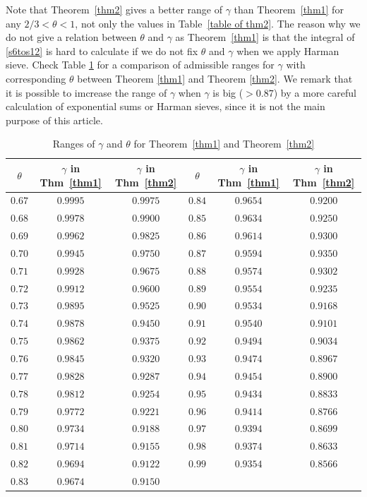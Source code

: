 \documentclass[12pt, reqno, twoside, letterpaper]{amsart}
\numberwithin{equation}{section}
\theoremstyle{customthm}
\theoremstyle{customrem}
\begin{document}
Note that Theorem~\ref{thm2} gives a better range of $\gamma$ than Theorem~\ref{thm1} for any $2/3 < \theta < 1$, not only the values in Table~\ref{table of thm2}. The reason why we do not give a relation between $\theta$ and $\gamma$ as Theorem~\ref{thm1} is that the integral of \eqref{s6tos12} is hard to calculate if we do not fix $\theta$ and $\gamma$ when we apply Harman sieve. Check Table \ref{table of thm1 and thm2} for a comparison of admissible ranges for $\gamma$ with corresponding $\theta$ between Theorem \ref{thm1} and Theorem \ref{thm2}. We remark that it is possible to imcrease the range of $\gamma$ when $\gamma$ is big ($>0.87$) by a more careful calculation of exponential sums or Harman sieves, since it is not the main purpose of this article. 

\begin{table}[htbp]	
	
	\centering
	\caption{Ranges of $\gamma$ and $\theta$ for Theorem~\ref{thm1} and Theorem~\ref{thm2} }
	\begin{tabular}{cccccc}
		\toprule
		$\theta$ & $\gamma$ in Thm~\ref{thm1} & $\gamma$ in Thm~\ref{thm2} & $\theta$ & $\gamma$ in Thm~\ref{thm1} & $\gamma$ in Thm~\ref{thm2} \\
		\midrule
		$0.67$   & $0.9995$   & $0.9975$  & $0.84$ & $0.9654$ & $0.9200$\\
		$0.68$   & $0.9978$   & $0.9900$  & $0.85$ & $0.9634$ & $0.9250$\\
		$0.69$   & $0.9962$   & $0.9825$  & $0.86$ & $0.9614$ & $0.9300$\\
		$0.70$   & $0.9945$   & $0.9750$  & $0.87$ & $0.9594$ & $0.9350$\\
		$0.71$   & $0.9928$   & $0.9675$  & $0.88$ & $0.9574$ & $0.9302$\\
		$0.72$   & $0.9912$   & $0.9600$  & $0.89$ & $0.9554$ & $0.9235$\\
		$0.73$   & $0.9895$   & $0.9525$  & $0.90$ & $0.9534$ & $0.9168$\\
		$0.74$   & $0.9878$   & $0.9450$  & $0.91$ & $0.9540$ & $0.9101$\\
		$0.75$   & $0.9862$   & $0.9375$  & $0.92$ & $0.9494$ & $0.9034$\\
		$0.76$   & $0.9845$   & $0.9320$   & $0.93$ & $0.9474$ & $0.8967$\\
		$0.77$   & $0.9828$   & $0.9287$   & $0.94$ & $0.9454$ & $0.8900$\\
		$0.78$   & $0.9812$   & $0.9254$   & $0.95$ & $0.9434$ & $0.8833$\\
		$0.79$   & $0.9772$   & $0.9221$   & $0.96$ & $0.9414$ & $0.8766$\\
		$0.80$   & $0.9734$   & $0.9188$   & $0.97$ & $0.9394$ & $0.8699$\\
		$0.81$   & $0.9714$   & $0.9155$   & $0.98$ & $0.9374$ & $0.8633$\\
		$0.82$   & $0.9694$   & $0.9122$   & $0.99$ & $0.9354$ & $0.8566$\\
		$0.83$   & $0.9674$   & $0.9150$   &        &          &         \\
		\bottomrule
	\end{tabular}
	\label{table of thm1 and thm2}
\end{table}
\end{document}

